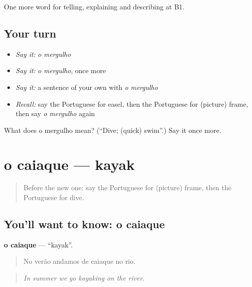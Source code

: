 \begin{grammarlens}[title={What you've built}]
One more word for telling, explaining and describing at B1.
\end{grammarlens}

\subsection*{Your turn}
\begin{itemize}
\raggedright
  \item \emph{Say it:} \emph{o mergulho}
  \item \emph{Say it:} \emph{o mergulho}, once more
  \item \emph{Say it:} a sentence of your own with \emph{o mergulho}
  \item \emph{Recall:} say the Portuguese for easel, then the Portuguese for (picture) frame, then say \emph{o mergulho} again
\end{itemize}

\begin{tcolorbox}[breakable,colback=teal!4,colframe=teal!35!black,title={Before you move on}]
What does o mergulho mean? (\textquotedblleft{}Dive; (quick) swim\textquotedblright{}.) Say it once more.
\end{tcolorbox}
\section[o caiaque]{o caiaque — kayak}

\label{lesson:PT-C506-caiaque}



\begin{quote}
Before the new one: say the Portuguese for (picture) frame, then the Portuguese for dive.
\end{quote}

\subsection*{You'll want to know: o caiaque}
\textbf{o caiaque} — \textquotedblleft{}kayak\textquotedblright{}.

\begin{quote}
No verão andamos de caiaque no rio.
\end{quote}

\begin{quote}
\emph{In summer we go kayaking on the river.}
\end{quote}

